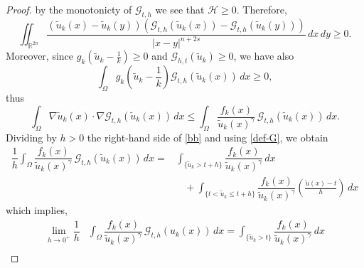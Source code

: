 \documentclass[11pt,a4paper]{amsart}
\def \R {\mathbb{R}}
\theoremstyle{definition}
\theoremstyle{plain}
\numberwithin{equation}{section}
\begin{document}
{\begin{proof}
by the monotonicty of $\mathcal{G}_{t,h}$ we see that
$\mathcal{H}\geq 0$.
Therefore, 
\begin{equation*}
 \iint_{\R^{2n}}\frac{(\tilde u_k(x)-\tilde u_k(y))\left(\mathcal{G}_{t,h}(\tilde u_k(x))-\mathcal{G}_{t,h}(\tilde u_k(y))\right)}{|x-y|^{n+2s}}\,dx\,dy\geq 0.
\end{equation*}
Moreover, since $g_k\left(\tilde u_k-\frac{1}{k}\right)\geq 0$ and $\mathcal{G}_{h,t}(\tilde u_k)\geq 0$, we have also
\begin{equation*}
    \int_\Omega g_k\left(\tilde u_k-\frac{1}{k}\right)\mathcal{G}_{t,h}(\tilde u_k(x))\,dx\geq 0,
\end{equation*}
thus
\begin{equation}\label{bb}
\int_\Omega\nabla \tilde u_k(x)\cdot\nabla\mathcal{G}_{t,h}(\tilde u_k(x))\,dx\leq \int_{\Omega}\frac{f_k(x)}{\tilde u_k(x)^{\gamma}}\,\mathcal{G}_{t,h}(\tilde u_k(x))\,dx.
\end{equation}
Dividing by $h>0$ the right-hand side of \eqref{bb} and using \eqref{def-G}, we obtain
\begin{equation*}
\begin{aligned}
\dfrac{1}{h} \int_{\Omega}\dfrac{f_k(x)}{\tilde u_k(x)^{\gamma}}\,\mathcal{G}_{t,h}(\tilde u_k(x))\,dx = &\int_{\{\tilde u_k>t+h\}}\dfrac{f_k(x)}{\tilde u_k(x)^{\gamma}}\,dx\\
&\ \ \ \ +\int_{\{t<\tilde u_k\leq t+h\}}\dfrac{f_k(x)}{\tilde u_k(x)^{\gamma}}\left( \frac{\tilde u(x)-t}{h}\right)\,dx\end{aligned}
\end{equation*}
which implies, %
\begin{equation}\label{lim-RHS}
	\begin{aligned}
    \lim_{h\to 0^+}\dfrac{1}{h}& \int_{\Omega}\dfrac{f_k(x)}{\tilde u_k(x)^{\gamma}}\,\mathcal{G}_{t,h}(u_k(x))\,dx =\int_{\{\tilde u_k>t\}}\dfrac{f_k(x)}{\tilde u_k(x)^{\gamma}}\,dx\\
\end{aligned}
\end{equation}

\end{proof}}
\end{document}
